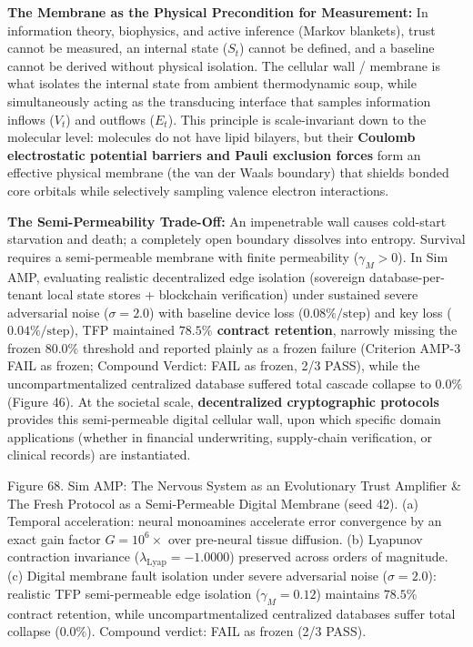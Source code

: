 \documentclass[
]{article}
\begin{document}
\textbf{The Membrane as the Physical Precondition for Measurement:} In
information theory, biophysics, and active inference (Markov blankets),
trust cannot be measured, an internal state (\(S_t\)) cannot be defined,
and a baseline cannot be derived without physical isolation. The
cellular wall / membrane is what isolates the internal state from
ambient thermodynamic soup, while simultaneously acting as the
transducing interface that samples information inflows (\(V_t\)) and
outflows (\(E_t\)). This principle is scale-invariant down to the
molecular level: molecules do not have lipid bilayers, but their
\textbf{Coulomb electrostatic potential barriers and Pauli exclusion
forces} form an effective physical membrane (the van der Waals boundary)
that shields bonded core orbitals while selectively sampling valence
electron interactions.

\textbf{The Semi-Permeability Trade-Off:} An impenetrable wall causes
cold-start starvation and death; a completely open boundary dissolves
into entropy. Survival requires a semi-permeable membrane with finite
permeability (\(\gamma_M > 0\)). In Sim AMP, evaluating realistic
decentralized edge isolation (sovereign database-per-tenant local state
stores + blockchain verification) under sustained severe adversarial
noise (\(\sigma = 2.0\)) with baseline device loss
(\(0.08\%/\text{step}\)) and key loss (\(0.04\%/\text{step}\)), TFP
maintained \textbf{\(78.5\%\) contract retention}, narrowly missing the
frozen \(80.0\%\) threshold and reported plainly as a frozen failure
(Criterion AMP-3 FAIL as frozen; Compound Verdict: FAIL as frozen, 2/3
PASS), while the uncompartmentalized centralized database suffered total
cascade collapse to \textbf{\(0.0\%\)} (Figure 46). At the societal
scale, \textbf{decentralized cryptographic protocols} provides this
semi-permeable digital cellular wall, upon which specific domain
applications (whether in financial underwriting, supply-chain
verification, or clinical records) are instantiated.

Figure 68. Sim AMP: The Nervous System as an Evolutionary Trust
Amplifier \& The Fresh Protocol as a Semi-Permeable Digital Membrane
(seed 42). (a) Temporal acceleration: neural monoamines accelerate error
convergence by an exact gain factor \(G = 10^6\times\) over pre-neural
tissue diffusion. (b) Lyapunov contraction invariance
(\(\lambda_{\text{Lyap}} = -1.0000\)) preserved across orders of
magnitude. (c) Digital membrane fault isolation under severe adversarial
noise (\(\sigma = 2.0\)): realistic TFP semi-permeable edge isolation
(\(\gamma_M = 0.12\)) maintains \(78.5\%\) contract retention, while
uncompartmentalized centralized databases suffer total collapse
(\(0.0\%\)). Compound verdict: FAIL as frozen (2/3 PASS).
\end{document}
